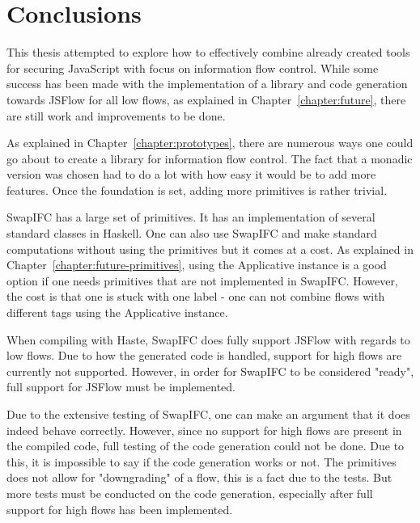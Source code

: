 \chapter{Conclusions}
This thesis attempted to explore how to effectively combine already created tools for securing JavaScript with focus on information flow control. While some success has been made with the implementation of a library and code generation towards JSFlow for all low flows, as explained in Chapter~\ref{chapter:future}, there are still work and improvements to be done.

As explained in Chapter~\ref{chapter:prototypes}, there are numerous ways one could go about to create a library for information flow control. The fact that a monadic version was chosen had to do a lot with how easy it would be to add more features. Once the foundation is set, adding more primitives is rather trivial.

SwapIFC has a large set of primitives. It has an implementation of several standard classes in Haskell. One can also use SwapIFC and make standard computations without using the primitives but it comes at a cost. As explained in Chapter~\ref{chapter:future-primitives}, using the Applicative instance is a good option if one needs primitives that are not implemented in SwapIFC. However, the cost is that one is stuck with one label - one can not combine flows with different tags using the Applicative instance.

When compiling with Haste, SwapIFC does fully support JSFlow with regards to low flows. Due to how the generated code is handled, support for high flows are currently not supported. However, in order for SwapIFC to be considered "ready", full support for JSFlow must be implemented.

Due to the extensive testing of SwapIFC, one can make an argument that it does indeed behave correctly. However, since no support for high flows are present in the compiled code, full testing of the code generation could not be done. Due to this, it is impossible to say if the code generation works or not. The primitives does not allow for "downgrading" of a flow, this is a fact due to the tests. But more tests must be conducted on the code generation, especially after full support for high flows has been implemented.

